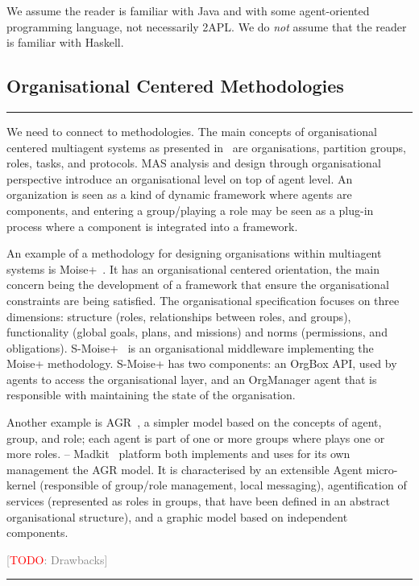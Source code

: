 \documentclass[conference,compsoc]{IEEEtran} %
\newcommand{\todo}[1]{{\small \textcolor{gray}{[\textcolor{red}{TODO}: #1]}}}
\newenvironment{notes}{\medskip\hrule\nobreak\smallskip\narrower}{\smallskip\hrule\medskip}
\begin{document}
We assume the reader is familiar with Java and with some agent-oriented
programming language, not necessarily 2APL. We do \emph{not} assume that
the reader is familiar with Haskell.

\subsection{Organisational Centered Methodologies} %

\begin{notes}
We need to connect to methodologies.
The main concepts of organisational centered multiagent systems as
presented in~\cite{DBLP:conf/aose/FerberGM03} are organisations, partition
groups, roles, tasks, and protocols. MAS analysis and design through
organisational perspective introduce an organisational level on top of
agent level. An organization is seen as a kind of dynamic framework where
agents are components, and entering a group/playing a role may be seen as a
plug-in process where a component is integrated into a framework.


An example of a methodology for designing organisations within multiagent
systems is Moise+~\cite{DBLP:conf/atal/HubnerSB05}. It has an
organisational centered orientation, the main concern being the development
of a framework that ensure the organisational constraints are being
satisfied. The organisational specification focuses on three dimensions:
structure (roles, relationships between roles, and groups), functionality
(global goals, plans, and missions) and norms (permissions, and
obligations). S-Moise+~\cite{DBLP:conf/atal/HubnerSB05} is an
organisational middleware implementing the Moise+ methodology. S-Moise+ has
two components: an OrgBox API, used by agents to access the organisational
layer, and an OrgManager agent that is responsible with maintaining the
state of the organisation.

Another example is AGR~\cite{DBLP:conf/aose/FerberGM03}, a simpler model
based on the concepts of agent, group, and role; each agent is part of one
or more groups where plays one or more roles. -- Madkit~\cite{} platform both implements and uses for its own management the AGR model. It is characterised by an extensible Agent micro-kernel (responsible of group/role management, local messaging), agentification of services (represented as roles in groups, that have been defined in an abstract organisational structure), and a graphic model based on independent components.


\todo{Drawbacks}

\end{notes}
\end{document}
